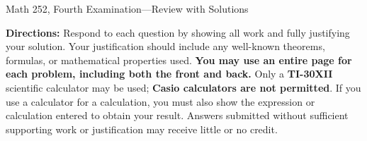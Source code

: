 \documentclass[11pt]{amsart}
\begin{document}
\begin{center}
\Large Math 252, Fourth Examination---\small Review with Solutions\normalsize\vspace{.1in}
\end{center}

\small
\textbf{Directions:} Respond to each question by showing all work and fully justifying your solution. Your justification should include any well-known theorems, formulas, or mathematical properties used. \textbf{You may use an entire page for each problem, including both the front and back.} Only a \textbf{TI-30XII} scientific calculator may be used; \textbf{Casio calculators are not permitted}. If you use a calculator for a calculation, you must also show the expression or calculation entered to obtain your result. Answers submitted without sufficient supporting work or justification may receive little or no credit.
\end{document}
